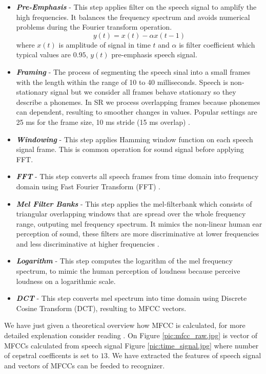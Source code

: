 \begin{itemize}
	\item \textit{\textbf{Pre-Emphasis}} - This step applies filter on the speech signal to amplify the high frequencies. It balances the frequency spectrum and avoids numerical problems during the Fourier transform operation.
    \[ y(t) = x(t) - {\alpha}x(t-1) \]
    where $x(t)$ is amplitude of signal in time $t$ and $\alpha$ is filter coefficient which typical values are $0.95$, $y(t)$ pre-emphasis speech signal.

	\item \textit{\textbf{Framing}} - The process of segmenting the speech sinal into a small frames with the length within the range of 10 to 40 milliseconds.
  Speech is non-stationary signal but we consider all frames behave stationary so they describe a phonemes.
  In SR we process overlapping frames because phonemes can dependent, resulting to smoother changes in values.
  Popular settings are 25 ms for the frame size, 10 ms stride (15 ms overlap) \cite{signal_raw}.

  \item \textit{\textbf{Windowing}} - This step applies Hamming window function\cite{windowing} on each speech signal frame. This is common operation for sound signal before applying FFT.

  \item \textit{\textbf{FFT}} - This step converts all speech frames from time domain into frequency domain using Fast Fourier Transform (FFT) \cite{fft}.

  \item \textit{\textbf{Mel Filter Banks}} - This step applies the mel-filterbank which consists of triangular overlapping windows that are spread over the whole frequency range, outputing mel frequency spectrum.
	It mimics the non-linear human ear perception of sound, these filters are more discriminative at lower frequencies and less discriminative at higher frequencies \cite{mel_filter_banks}.

  \item \textit{\textbf{Logarithm}} - This step computes the logarithm of the mel frequency spectrum, to mimic the human perception of loudness because perceive loudness on a logarithmic scale.

  \item \textit{\textbf{DCT}} - This step converts mel spectrum into time domain using Discrete Cosine Transform (DCT)\cite{dcs}, resulting to MFCC vectors.

\end{itemize}
We have just given a theoretical overview how MFCC is calculated, for more detailed explenation consider reading \cite{mfcc_what}.
On Figure \ref{pic:mfcc_raw.jpg} is vector of MFCCs calculated from speech signal Figure \ref{pic:time_signal.jpg} where number of cepstral coefficents is set to $13$.
We have extracted the features of speech signal and vectors of MFCCs can be feeded to recognizer.

